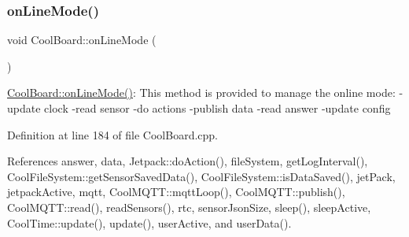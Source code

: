 \subsubsection{\texorpdfstring{on\+Line\+Mode()}{onLineMode()}}
{\footnotesize\ttfamily void Cool\+Board\+::on\+Line\+Mode (\begin{DoxyParamCaption}{ }\end{DoxyParamCaption})}

\hyperlink{classCoolBoard_aa0bbc4bc605e35618d18e68795c61363}{Cool\+Board\+::on\+Line\+Mode()}\+: This method is provided to manage the online mode\+: -\/update clock -\/read sensor -\/do actions -\/publish data -\/read answer -\/update config 

Definition at line 184 of file Cool\+Board.\+cpp.



References answer, data, Jetpack\+::do\+Action(), file\+System, get\+Log\+Interval(), Cool\+File\+System\+::get\+Sensor\+Saved\+Data(), Cool\+File\+System\+::is\+Data\+Saved(), jet\+Pack, jetpack\+Active, mqtt, Cool\+M\+Q\+T\+T\+::mqtt\+Loop(), Cool\+M\+Q\+T\+T\+::publish(), Cool\+M\+Q\+T\+T\+::read(), read\+Sensors(), rtc, sensor\+Json\+Size, sleep(), sleep\+Active, Cool\+Time\+::update(), update(), user\+Active, and user\+Data().


